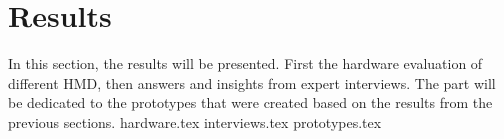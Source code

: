 \chapter{Results}
In this section, the results will be presented. First the hardware evaluation of different HMD, then answers and insights from expert interviews. The part will be dedicated to the prototypes that were created based on the results from the previous sections.
{hardware.tex}
{interviews.tex}
{prototypes.tex}
